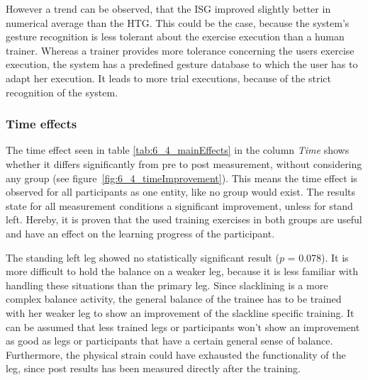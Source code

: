 
However a trend can be observed, that the ISG improved slightly better in numerical average than the HTG.
This could be the case, because the system's gesture recognition is less tolerant about the exercise execution than a human trainer.
Whereas a trainer provides more tolerance concerning the users exercise execution, the system has a predefined gesture database to which the user has to adapt her execution.
It leads to more trial executions, because of the strict recognition of the system.

\subsubsection{Time effects}
The time effect seen in table \ref{tab:6_4_mainEffects} in the column \textit{Time} shows whether it differs significantly from pre to post measurement, without considering any group (see figure~\ref{fig:6_4_timeImprovement}).
This means the time effect is observed for all participants as one entity, like no group would exist.
The results state for all measurement conditions a significant improvement, unless for stand left.
Hereby, it is proven that the used training exercises in both groups are useful and have an effect on the learning progress of the participant.

The standing left leg showed no statistically significant result ($p$ = 0.078).
It is more difficult to hold the balance on a weaker leg, because it is less familiar with handling these situations than the primary leg.
Since slacklining is a more complex balance activity, the general balance of the trainee has to be trained with her weaker leg to show an improvement of the slackline specific training.
It can be assumed that less trained legs or participants won't show an improvement as good as legs or participants that have a certain general sense of balance.
Furthermore, the physical strain could have exhausted the functionality of the leg, since post results has been measured directly after the training.

